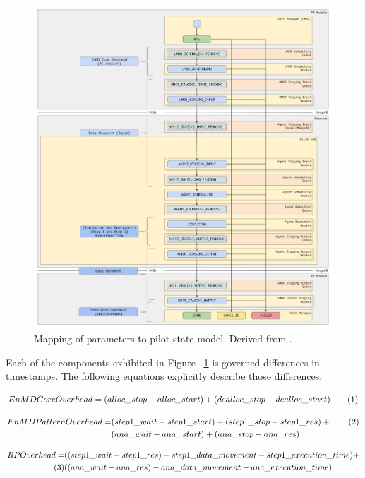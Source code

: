 \documentclass[]{article}
\newcommand\numberthis{\addtocounter{equation}{1}\tag{\theequation}}
\begin{document}
		\begin{figure}[H]
			\centering
			\includegraphics[scale=.15]{diagrams/enmd_state_model_mapping.jpg}
			\caption{Mapping of parameters to pilot state model. Derived from \cite{rp_state_diagram}.}
			\label{fig:param_pilot_state_mapping}
		\end{figure}


		Each of the components exhibited in Figure ~\ref{fig:param_pilot_state_mapping} is governed differences in timestamps. The following equations explicitly describe those differences.

		\begin{align*}
			EnMD Core Overhead = (alloc\_stop - alloc\_start) + (dealloc\_stop - dealloc\_start) \numberthis \label{1}
		\end{align*}

		\begin{align*}
			EnMD Pattern Overhead = &(step1\_wait-step1\_start) + (step1\_stop - step1\_res) + \numberthis \label{2} \\
									&(ana\_wait-ana\_start) + (ana\_stop - ana\_res) 
		\end{align*}

		\begin{align*}
			RP Overhead = &((step1\_wait - step1\_res) - step1\_data\_movement - step1\_execution\_time) + \\ \numberthis \label{3} 
						  &((ana\_wait - ana\_res) - ana\_data\_movement - ana\_execution\_time) 
		\end{align*}
\end{document}
